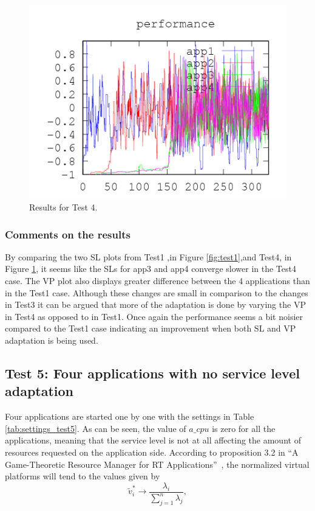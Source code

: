 \documentclass[nobiblatex]{LTHthesis}
\newcommand{\tv}{\tilde{v}}
\begin{document}
\begin{figure}[th]
\begin{minipage}{0.49\textwidth}
  \includegraphics[width=\textwidth]{"tools/plot/logs/test4/f"}
  \end{minipage}
\caption{Results for Test 4.}
\label{fig:test4}
\end{figure}

\clearpage
\subsubsection{Comments on the results}
By comparing the two SL plots from Test1 ,in Figure \ref{fig:test1},and Test4, in Figure \ref{fig:test4}, it seems like the SLs for app3 and app4 converge slower in the Test4 case. 
The VP plot also displays greater difference between the 4 applications than in the Test1 case. Although these changes are small in comparison to the changes in Test3 it can be argued that more of the adaptation is done by varying the VP in Test4 as opposed to in Test1. Once again the performance seems a bit noisier compared to the Test1 case indicating an improvement when both SL and VP adaptation is being used.

\subsection{Test 5: Four applications with no service level adaptation}

Four applications are started one by one with the settings in 
Table \ref{tab:settings_test5}. As can be seen, the value of $a\_cpu$ is
zero for all the applications, meaning that the service level is not
at all affecting the amount of resources requested on the application side.
According to proposition 3.2 in ``A Game-Theoretic Resource Manager for 
RT Applications''~\cite{gtrm}, the normalized virtual platforms will tend 
to the values given by
\begin{equation}
  \tv_i^* \to \frac{\lambda_i}{\sum_{j=1}^{n}\lambda_j},
  \label{eq:SpecialStationaryPoint}
\end{equation}
\end{document}
